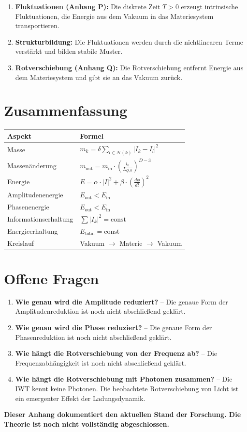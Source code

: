 \begin{enumerate}
    \item \textbf{Fluktuationen (Anhang P):} Die diskrete Zeit $T > 0$ erzeugt intrinsische Fluktuationen, die Energie aus dem Vakuum in das Materiesystem transportieren.
    \item \textbf{Strukturbildung:} Die Fluktuationen werden durch die nichtlinearen Terme verstärkt und bilden stabile Muster.
    \item \textbf{Rotverschiebung (Anhang Q):} Die Rotverschiebung entfernt Energie aus dem Materiesystem und gibt sie an das Vakuum zurück.
\end{enumerate}

\section{Zusammenfassung}
\label{app:rotverschiebung_zusammenfassung}

\begin{tabular}{l|l}
\hline
\textbf{Aspekt} & \textbf{Formel} \\
\hline
Masse & $m_k = \delta \sum_{l \in \mathcal{N}(k)} |I_k - I_l|^2$ \\
Massenänderung & $m_{\text{out}} = m_{\text{in}} \cdot \left( \frac{l_0}{L_{Q,0}} \right)^{D-3}$ \\
Energie & $E = \alpha \cdot |I|^2 + \beta \cdot \left( \frac{d\phi}{dt} \right)^2$ \\
Amplitudenenergie & $E_{\text{out}} < E_{\text{in}}$ \\
Phasenenergie & $E_{\text{out}} < E_{\text{in}}$ \\
Informationserhaltung & $\sum |I_k|^2 = \text{const}$ \\
Energieerhaltung & $E_{\text{total}} = \text{const}$ \\
Kreislauf & Vakuum $\rightarrow$ Materie $\rightarrow$ Vakuum \\
\hline
\end{tabular}

\section{Offene Fragen}
\label{app:rotverschiebung_offene_fragen}

\begin{enumerate}
    \item \textbf{Wie genau wird die Amplitude reduziert?} – Die genaue Form der Amplitudenreduktion ist noch nicht abschließend geklärt.
    \item \textbf{Wie genau wird die Phase reduziert?} – Die genaue Form der Phasenreduktion ist noch nicht abschließend geklärt.
    \item \textbf{Wie hängt die Rotverschiebung von der Frequenz ab?} – Die Frequenzabhängigkeit ist noch nicht abschließend geklärt.
    \item \textbf{Wie hängt die Rotverschiebung mit Photonen zusammen?} – Die IWT kennt keine Photonen. Die beobachtete Rotverschiebung von Licht ist ein emergenter Effekt der Ladungsdynamik.
\end{enumerate}

\textbf{Dieser Anhang dokumentiert den aktuellen Stand der Forschung. Die Theorie ist noch nicht vollständig abgeschlossen.}